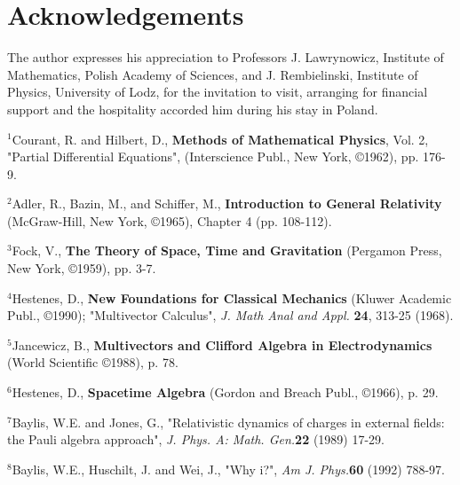 \section{Acknowledgements}
	The author expresses his appreciation to Professors J. Lawrynowicz,
 Institute of Mathematics, Polish Academy of Sciences, and J. Rembielinski,
 Institute of Physics, University of Lodz, for the invitation to visit,
 arranging for financial support and the hospitality accorded him during
 his stay in Poland.

\begin{thebibliography}{}

\bibitem[]{} $^1$Courant, R. and Hilbert, D., {\bf Methods of Mathematical
 Physics}, Vol. 2, "Partial Differential Equations",
 (Interscience Publ., New York, \copyright 1962), pp. 176-9.

\bibitem[]{} $^2$Adler, R., Bazin, M., and Schiffer, M., {\bf Introduction
 to General Relativity} (McGraw-Hill, New York, \copyright 1965),
 Chapter 4 (pp. 108-112).

\bibitem[]{} $^3$Fock, V., {\bf The Theory of Space, Time and Gravitation}
 (Pergamon Press, New York, \copyright 1959), pp. 3-7.

\bibitem[]{} $^4$Hestenes, D., {\bf New Foundations for Classical Mechanics}
 (Kluwer Academic Publ., \copyright 1990); "Multivector Calculus",
 {\it J. Math Anal and Appl.} {\bf 24}, 313-25 (1968).

\bibitem[]{} $^5$Jancewicz, B., {\bf Multivectors and Clifford Algebra in
 Electrodynamics} (World Scientific \copyright 1988), p. 78.

\bibitem[]{}$^6$Hestenes, D., {\bf Spacetime Algebra} (Gordon and
 Breach Publ., \copyright 1966), p. 29.

\bibitem[]{} $^7$Baylis, W.E. and Jones, G., "Relativistic dynamics of
 charges in external fields: the Pauli algebra approach", {\it J. Phys.
 A: Math. Gen.}{\bf 22} (1989) 17-29.

\bibitem[]{}  $^8$Baylis, W.E., Huschilt, J. and Wei, J., "Why i?",
{\it Am J. Phys.}{\bf 60} (1992) 788-97.

\end{thebibliography}



